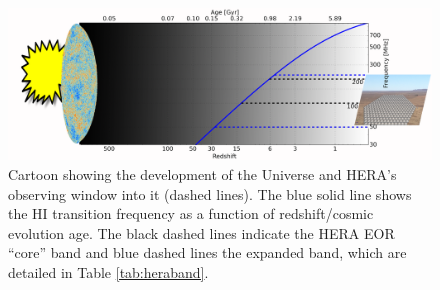 \documentclass[ars]{/Users/daviddeboer1/Documents/Papers/Copernicus_LaTeX_Package_v_2_7/copernicus}
\def\HI{{H{\small I }}}
\begin{document}


\begin{figure}[ht]
\vspace*{2mm}
\begin{center}
\includegraphics[width=\textwidth]{plots/herauniall.png}
\end{center}
\caption{\small Cartoon showing the development of the Universe and HERA's observing window into it (dashed lines).  The blue solid
line shows the \HI transition frequency as a function of redshift/cosmic evolution age.  The black dashed lines indicate the HERA EOR ``core'' band and blue dashed lines the expanded band, which are detailed in Table \ref{tab:heraband}.}
\label{fig:theUniverse}
\end{figure}
\end{document}
